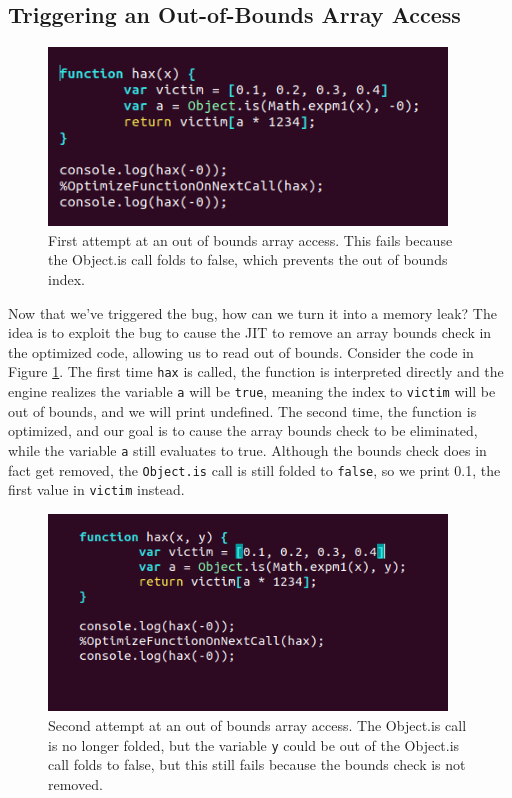 \documentclass[11pt]{article}
\begin{document}
\subsection{Triggering an Out-of-Bounds Array Access}
\begin{figure}
	\centering
	\includegraphics[width=300pt]{example3.png}
	\caption{First attempt at an out of bounds array access. This fails because the Object.is
	call folds to false, which prevents the out of bounds index.}
  \label{fig:example3}
\end{figure}
Now that we've triggered the bug, how can we turn it into a memory leak? The idea is to exploit the
bug to cause the JIT to remove an array bounds check in the optimized code, allowing us to read out
of bounds. Consider the code in Figure \ref{fig:example3}. The first time \texttt{hax} is called,
the function is interpreted directly and the engine realizes the variable \texttt{a} will be
\texttt{true}, meaning the index to \texttt{victim} will be out of bounds, and we will print
undefined. The second time, the function is optimized, and our goal is to cause the array bounds
check to be eliminated, while the variable \texttt{a} still evaluates to true. Although the bounds
check does in fact get removed, the \texttt{Object.is} call is still folded to \texttt{false}, so we
print 0.1, the first value in \texttt{victim} instead.

\begin{figure}
	\centering
	\includegraphics[width=300pt]{example5.png}
	\caption{Second attempt at an out of bounds array access. The Object.is call is no longer
	folded, but the variable \texttt{y} could be out of  the Object.is call folds to false,
	but this still fails because the bounds check is not removed.}
  \label{fig:example5}
\end{figure}
\end{document}
